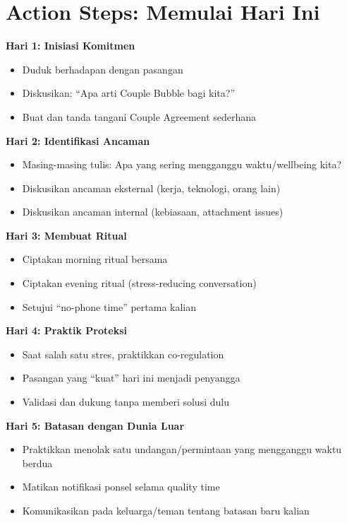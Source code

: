 \section{Action Steps: Memulai Hari Ini}

\begin{exercisebox}

\textbf{Hari 1: Inisiasi Komitmen}
\begin{itemize}
    \item Duduk berhadapan dengan pasangan
    \item Diskusikan: ``Apa arti Couple Bubble bagi kita?''
    \item Buat dan tanda tangani Couple Agreement sederhana
\end{itemize}

\textbf{Hari 2: Identifikasi Ancaman}
\begin{itemize}
    \item Masing-masing tulis: Apa yang sering mengganggu waktu/wellbeing kita?
    \item Diskusikan ancaman eksternal (kerja, teknologi, orang lain)
    \item Diskusikan ancaman internal (kebiasaan, attachment issues)
\end{itemize}

\textbf{Hari 3: Membuat Ritual}
\begin{itemize}
    \item Ciptakan morning ritual bersama
    \item Ciptakan evening ritual (stress-reducing conversation)
    \item Setujui ``no-phone time'' pertama kalian
\end{itemize}

\textbf{Hari 4: Praktik Proteksi}
\begin{itemize}
    \item Saat salah satu stres, praktikkan co-regulation
    \item Pasangan yang ``kuat'' hari ini menjadi penyangga
    \item Validasi dan dukung tanpa memberi solusi dulu
\end{itemize}

\textbf{Hari 5: Batasan dengan Dunia Luar}
\begin{itemize}
    \item Praktikkan menolak satu undangan/permintaan yang mengganggu waktu berdua
    \item Matikan notifikasi ponsel selama quality time
    \item Komunikasikan pada keluarga/teman tentang batasan baru kalian
\end{itemize}


\end{exercisebox}
